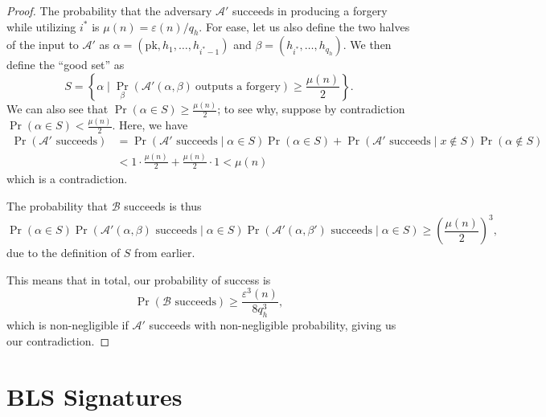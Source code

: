 \documentclass[12pt]{tufte-book}
\begin{document}
\begin{proof}
    The probability that the adversary $\mathcal{A}'$ succeeds in producing a forgery while utilizing $i^*$ is $\mu(n) = \varepsilon(n) / q_h$. For ease, let us also define the two halves of the input to $\mathcal{A}'$ as $\alpha = (\mathrm{pk}, h_1, \ldots, h_{i^* - 1})$ and $\beta = (h_{i^*}, \ldots, h_{q_h})$. We then define the ``good set'' as
    \[
        S = \left\{\alpha \mid \Pr_{\beta}(\mathcal{A}'(\alpha, \beta)\ \text{outputs a forgery}) \ge \frac{\mu(n)}{2}\right\}
    .\]
    We can also see that $\Pr(\alpha \in S) \ge \frac{\mu(n)}{2}$; to see why, suppose by contradiction $\Pr(\alpha \in S) < \frac{\mu(n)}{2}$. Here, we have
    \begin{align*}
        \Pr(\text{$\mathcal{A}'$ succeeds}) &= \Pr(\text{$\mathcal{A}'$ succeeds} \mid \alpha \in S) \Pr(\alpha \in S) + \Pr(\text{$\mathcal{A}'$ succeeds} \mid x \notin S) \Pr(\alpha \notin S) \\
                                            &< 1 \cdot \frac{\mu(n)}{2} + \frac{\mu(n)}{2} \cdot 1 < \mu(n)
    \end{align*}
    which is a contradiction.

    The probability that $\mathcal{B}$ succeeds is thus
    \[
        \Pr(\alpha \in S) \Pr(\text{$\mathcal{A}'(\alpha, \beta)$ succeeds} \mid \alpha \in S) \Pr(\text{$\mathcal{A}'(\alpha, \beta')$ succeeds} \mid \alpha \in S)
        \ge \left(\frac{\mu(n)}{2}\right)^3
    ,\]
    due to the definition of $S$ from earlier.

    This means that in total, our probability of success is
    \[
        \Pr(\text{$\mathcal{B}$ succeeds}) \ge \frac{\varepsilon^3(n)}{8q_h^3}
    ,\]
    which is non-negligible if $\mathcal{A}'$ succeeds with non-negligible probability, giving us our contradiction.
\end{proof}


\section{BLS Signatures}
\end{document}
